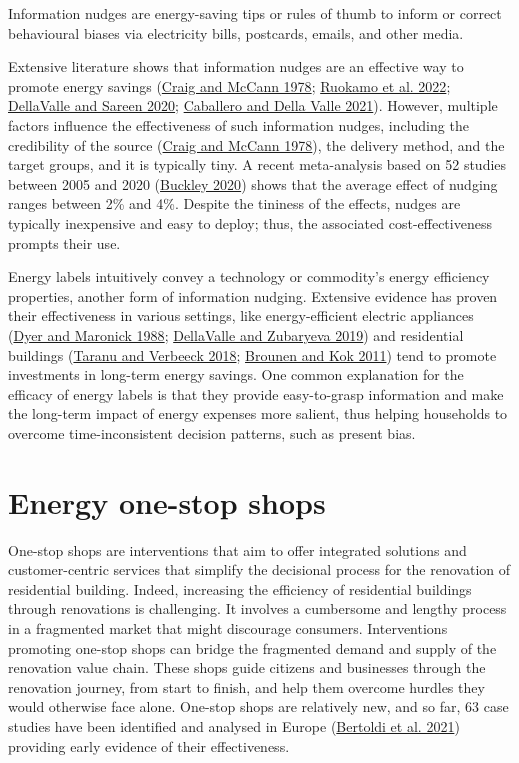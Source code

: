 \documentclass[
  11pt,
  captions=heading]{scrreport}
\begin{document}
Information nudges are energy-saving tips or rules of thumb to inform or
correct behavioural biases via electricity bills, postcards, emails, and
other media.

Extensive literature shows that information nudges are an effective way
to promote energy savings
(\protect\hyperlink{ref-craig1978assessing}{Craig and McCann 1978};
\protect\hyperlink{ref-ruokamo2022effect}{Ruokamo et al. 2022};
\protect\hyperlink{ref-dellavalle2020nudging}{DellaValle and Sareen
2020}; \protect\hyperlink{ref-caballero2021tackling}{Caballero and Della
Valle 2021}). However, multiple factors influence the effectiveness of
such information nudges, including the credibility of the source
(\protect\hyperlink{ref-craig1978assessing}{Craig and McCann 1978}), the
delivery method, and the target groups, and it is typically tiny. A
recent meta-analysis based on 52 studies between 2005 and 2020
(\protect\hyperlink{ref-buckley2020prices}{Buckley 2020}) shows that the
average effect of nudging ranges between 2\% and 4\%. Despite the
tininess of the effects, nudges are typically inexpensive and easy to
deploy; thus, the associated cost-effectiveness prompts their use.

Energy labels intuitively convey a technology or commodity's energy
efficiency properties, another form of information nudging. Extensive
evidence has proven their effectiveness in various settings, like
energy-efficient electric appliances
(\protect\hyperlink{ref-dyer1988evaluation}{Dyer and Maronick 1988};
\protect\hyperlink{ref-dellavalle2019can}{DellaValle and Zubaryeva
2019}) and residential buildings
(\protect\hyperlink{ref-taranu2018closer}{Taranu and Verbeeck 2018};
\protect\hyperlink{ref-brounen2011economics}{Brounen and Kok 2011}) tend
to promote investments in long-term energy savings. One common
explanation for the efficacy of energy labels is that they provide
easy-to-grasp information and make the long-term impact of energy
expenses more salient, thus helping households to overcome
time-inconsistent decision patterns, such as present bias.

\hypertarget{energy-one-stop-shops}{%
\section{Energy one-stop shops}\label{energy-one-stop-shops}}

One-stop shops are interventions that aim to offer integrated solutions
and customer-centric services that simplify the decisional process for
the renovation of residential building. Indeed, increasing the
efficiency of residential buildings through renovations is challenging.
It involves a cumbersome and lengthy process in a fragmented market that
might discourage consumers. Interventions promoting one-stop shops can
bridge the fragmented demand and supply of the renovation value chain.
These shops guide citizens and businesses through the renovation
journey, from start to finish, and help them overcome hurdles they would
otherwise face alone. One-stop shops are relatively new, and so far, 63
case studies have been identified and analysed in Europe
(\protect\hyperlink{ref-bertoldi2021role}{Bertoldi et al. 2021})
providing early evidence of their effectiveness.
\end{document}
